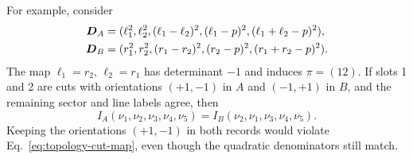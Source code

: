 For example, consider
\begin{align}
 \boldsymbol D_A&=(\ell_1^2,\ell_2^2,(\ell_1-\ell_2)^2,
 (\ell_1-p)^2,(\ell_1+\ell_2-p)^2),\notag\\
 \boldsymbol D_B&=(r_1^2,r_2^2,(r_1-r_2)^2,
 (r_2-p)^2,(r_1+r_2-p)^2).
 \label{eq:topology-example-families}
\end{align}
The map $\ell_1=r_2$, $\ell_2=r_1$ has determinant $-1$ and induces
$\pi=(12)$.  If slots 1 and 2 are cuts with orientations
$(+1,-1)$ in $A$ and $(-1,+1)$ in $B$, and the remaining sector and
line labels agree, then
\begin{equation}
 I_A(\nu_1,\nu_2,\nu_3,\nu_4,\nu_5)
 =I_B(\nu_2,\nu_1,\nu_3,\nu_4,\nu_5).
 \label{eq:topology-example-identity}
\end{equation}
Keeping the orientations $(+1,-1)$ in both records would violate
Eq.~\eqref{eq:topology-cut-map}, even though the quadratic denominators still
match.
